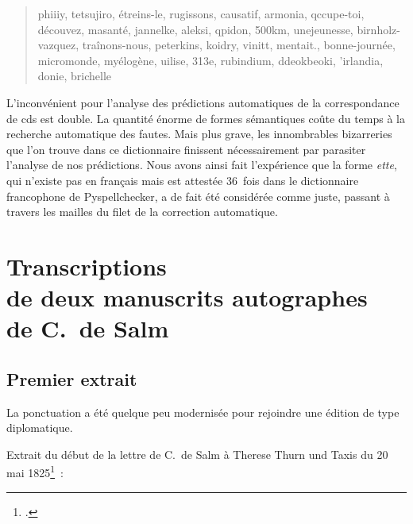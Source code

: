 \documentclass[a4paper,12pt,twoside]{book}
\begin{document}
				\begin{quote}
					phiiiy, tetsujiro, étreins-le, rugissons, causatif, armonia, qccupe-toi, découvez, masanté, jannelke, aleksi, qpidon, 500km, unejeunesse, birnholz-vazquez, traînons-nous, peterkins, koidry, vinitt, mentait., bonne-journée, micromonde, myélogène, uilise, 313e, rubindium, ddeokbeoki, 'irlandia, donie, brichelle
				\end{quote}
			
				L'inconvénient pour l'analyse des prédictions automatiques de la correspondance de \gls{cds} est double. La quantité énorme de formes sémantiques coûte du temps à la recherche automatique des fautes. Mais plus grave, les innombrables bizarreries que l'on trouve dans ce dictionnaire finissent nécessairement par parasiter l'analyse de nos prédictions. Nous avons ainsi fait l'expérience que la forme \textit{ette}, qui n'existe pas en français mais est attestée 36~fois dans le dictionnaire francophone de Pyspellchecker, a de fait été considérée comme juste, passant à travers les mailles du filet de la correction automatique.
								
			
	\appendix
	
	\renewcommand{\appendixpagename}{Annexes}
	
	\renewcommand{\appendixtocname}{Annexes}
	
	\addappheadtotoc%
	
	\appendixpage %
	
	\chapter{Transcriptions \\de deux manuscrits autographes \\de C.~de Salm}
		\label{autographes}
		
		\section{Premier extrait}
	
			La ponctuation a été quelque peu modernisée pour rejoindre une édition de type diplomatique.
		
			Extrait du début de la lettre de C.~de Salm à Therese Thurn und Taxis du 20 mai 1825\footcite{CdS67022030}~:
			
\end{document}
